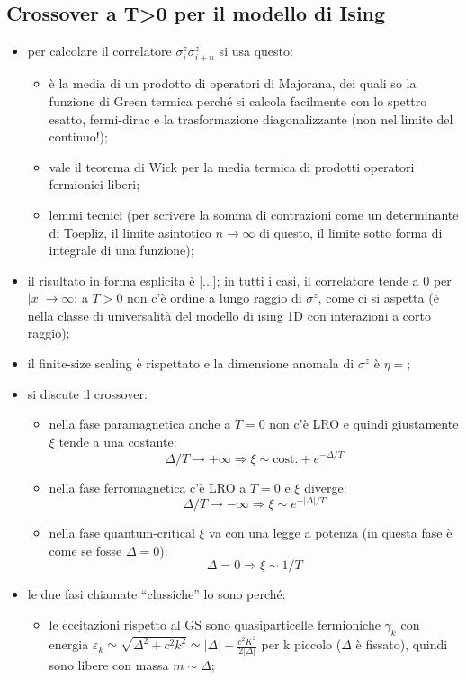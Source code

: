\documentclass[a4paper,11pt]{article}
\newcommand{\csi}{\xi}
\newcommand{\ssubsection}[1]{\vspace{0.2cm} \subsection{#1}}
\begin{document}
\ssubsection{Crossover a T>0 per il modello di Ising}
\begin{itemize}
 \item per calcolare il correlatore $\sigma^z_i\sigma^z_{i+n}$ si usa questo: 
      \begin{itemize} 
      \item è la media di un prodotto di operatori di Majorana, dei quali so la funzione di Green termica perché si calcola facilmente con lo spettro esatto, fermi-dirac e la trasformazione diagonalizzante (non nel limite del continuo!);
      \item vale il teorema di Wick per la media termica di prodotti operatori fermionici liberi;
      \item lemmi tecnici (per scrivere la somma di contrazioni come un determinante di Toepliz, il limite asintotico $n\to\infty$ di questo, il limite sotto forma di integrale di una funzione);
      \end{itemize}
 \item il risultato in forma esplicita è [...]; in tutti i casi, il correlatore tende a 0 per $|x|\to\infty$: a $T>0$ non c'è ordine a lungo raggio di $\sigma^z$, come  ci si aspetta (è nella classe di universalità del modello di ising 1D con interazioni a corto raggio);
 \item il finite-size scaling è rispettato e la dimensione anomala di $\sigma^z$ è $\eta = $;
 \item si discute il crossover:
      \begin{itemize}
      \item nella fase paramagnetica anche a $T=0$ non c'è LRO e quindi giustamente $\csi$ tende a una costante: \[\Delta/T \to +\infty \Rightarrow \csi \sim \text{cost.} + e^{-\Delta/T}\] 
      \item nella fase ferromagnetica c'è LRO a $T=0$ e $\csi$ diverge: \[\Delta/T \to -\infty \Rightarrow \csi \sim e^{-|\Delta|/T}\]
      \item nella fase quantum-critical  $\csi$ va con una legge a potenza (in questa fase è come se fosse $\Delta=0$): \[\Delta=0 \Rightarrow \csi \sim 1/T \]
      \end{itemize}
 \item le due fasi chiamate ``classiche'' lo sono perché: 
      \begin{itemize}
       \item le eccitazioni rispetto al GS sono quasiparticelle fermioniche $\gamma_k$ con energia $\varepsilon_k \simeq \sqrt{\Delta^2 + c^2k^2} \simeq |\Delta| + \frac{c^2K^2}{2|\Delta|}$ per k piccolo ($\Delta$ è fissato), quindi sono libere con massa $m\sim \Delta$;

\end{itemize}
\end{itemize}
\end{document}

